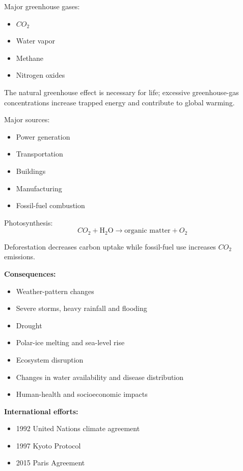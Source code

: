 \documentclass[12pt]{article}
\begin{document}
Major greenhouse gases:
\begin{itemize}
    \item $CO_2$
    \item Water vapor
    \item Methane
    \item Nitrogen oxides
\end{itemize}

The natural greenhouse effect is necessary for life; excessive greenhouse-gas concentrations increase trapped energy and contribute to global warming.

Major sources:
\begin{itemize}
    \item Power generation
    \item Transportation
    \item Buildings
    \item Manufacturing
    \item Fossil-fuel combustion
\end{itemize}

Photosynthesis:
\begin{equation*}
CO_2+\mathrm{H_2O}
\rightarrow
\text{organic matter}+O_2
\end{equation*}

Deforestation decreases carbon uptake while fossil-fuel use increases $CO_2$ emissions.

\textbf{Consequences:}
\begin{itemize}
    \item Weather-pattern changes
    \item Severe storms, heavy rainfall and flooding
    \item Drought
    \item Polar-ice melting and sea-level rise
    \item Ecosystem disruption
    \item Changes in water availability and disease distribution
    \item Human-health and socioeconomic impacts
\end{itemize}

\textbf{International efforts:}
\begin{itemize}
    \item 1992 United Nations climate agreement
    \item 1997 Kyoto Protocol
    \item 2015 Paris Agreement
\end{itemize}
\end{document}
